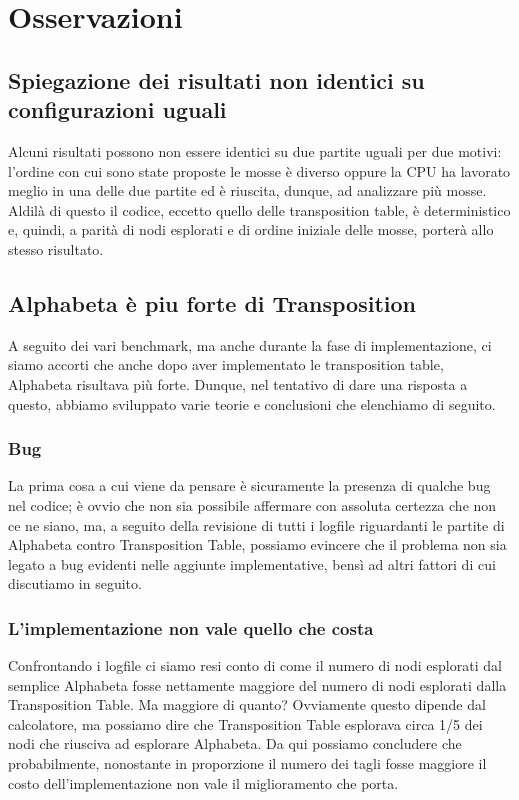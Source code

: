 \documentclass{article}
\begin{document}
\section{Osservazioni}
\subsection{Spiegazione dei risultati non identici su configurazioni uguali}
Alcuni risultati possono non essere identici su due partite uguali per due motivi: l'ordine con cui sono state proposte le mosse è diverso oppure la CPU ha lavorato meglio in una delle due partite ed è riuscita, dunque, ad analizzare più mosse. Aldilà di questo il codice, eccetto quello delle transposition table, è deterministico e, quindi, a parità di nodi esplorati e di ordine iniziale delle mosse, porterà allo stesso risultato.
\subsection{Alphabeta è piu forte di Transposition}
A seguito dei vari benchmark, ma anche durante la fase di implementazione, ci siamo accorti che anche dopo aver implementato le transposition table, Alphabeta risultava più forte. Dunque, nel tentativo di dare una risposta a questo, abbiamo sviluppato varie teorie e conclusioni che elenchiamo di seguito.
\subsubsection{Bug}
La prima cosa a cui viene da pensare è sicuramente la presenza di qualche bug nel codice; è ovvio che non sia possibile affermare con assoluta certezza che non ce ne siano, ma, a seguito della revisione di tutti i logfile riguardanti le partite di Alphabeta contro Transposition Table, possiamo evincere che il problema non sia legato a bug evidenti nelle aggiunte implementative, bensì ad altri fattori di cui discutiamo in seguito.

\subsubsection{L'implementazione non vale quello che costa}
Confrontando i logfile ci siamo resi conto di come il numero di nodi esplorati dal semplice Alphabeta fosse nettamente maggiore del numero di nodi esplorati dalla Transposition Table. Ma maggiore di quanto? Ovviamente questo dipende dal calcolatore, ma possiamo dire che Transposition Table esplorava circa 1/5 dei nodi che riusciva ad esplorare Alphabeta. Da qui possiamo concludere che probabilmente, nonostante in proporzione il numero dei tagli fosse maggiore  il costo dell'implementazione non vale il miglioramento che porta.
\end{document}
